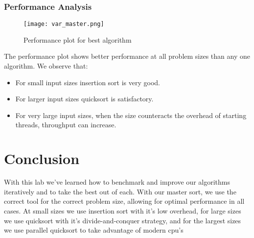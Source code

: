 \documentclass[twocolumn]{article}
\begin{document}
\subsubsection{Performance Analysis}
\begin{figure}[H]
    \centering
    \texttt{[image: var\_master.png]}
    \caption{Performance plot for best algorithm}
    \label{fig:variantmaster_plot}
\end{figure}

The performance plot shows better performance at all problem sizes than any one algorithm. We observe that:
\begin{itemize}
    \item For small input sizes insertion sort is very good.
    \item For larger input sizes quicksort is satisfactory.
    \item For very large input sizes, when the size counteracts the overhead of starting threads, throughput can increase.
\end{itemize}


\section{Conclusion}
With this lab we've learned how to benchmark and improve our algorithms iteratively and to take the best out of each. With our master sort, we use the correct tool for the correct problem size, allowing for optimal performance in all cases. At small sizes we use insertion sort with it's low overhead, for large sizes we use quicksort with it's divide-and-conquer strategy, and for the largest sizes we use parallel quicksort to take advantage of modern cpu's
\end{document}
